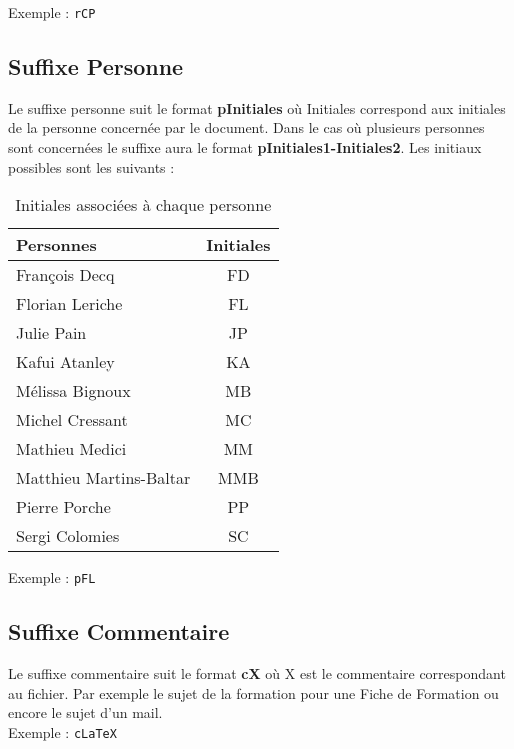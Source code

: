Exemple : \verb+rCP+

\subsection{Suffixe Personne}
\label{suffixe_personne}

Le suffixe personne suit le format \textbf{pInitiales} où Initiales correspond aux initiales de la personne concernée par le document. Dans le cas où plusieurs personnes sont concernées le suffixe aura le format \textbf{pInitiales1-Initiales2}. Les initiaux possibles sont les suivants :
\begin{table}[H]
	\centering
	\begin{tabularx}{10cm}{|X|c|}
	\hline
	\rowcolor[gray]{0.85} Personnes & Initiales\\
	\hline
	François Decq & FD \\
	\hline
	Florian Leriche & FL \\
	\hline
	Julie Pain & JP \\
	\hline
	Kafui Atanley & KA \\
	\hline
	Mélissa Bignoux & MB \\
	\hline
	Michel Cressant & MC \\
	\hline
	Mathieu Medici & MM \\
	\hline
	Matthieu Martins-Baltar & MMB \\
	\hline
	Pierre Porche & PP \\
	\hline
	Sergi Colomies & SC \\
	\hline
	\end{tabularx}
	\caption{Initiales associées à chaque personne}
	\label{Initiales}
\end{table}

Exemple : \verb+pFL+

\subsection{Suffixe Commentaire}
\label{suffixe_commentaire}

Le suffixe commentaire suit le format \textbf{cX} où X est le commentaire correspondant au fichier. Par exemple le sujet de la formation pour une Fiche de Formation ou encore le sujet d'un mail.\\

Exemple : \verb+cLaTeX+

